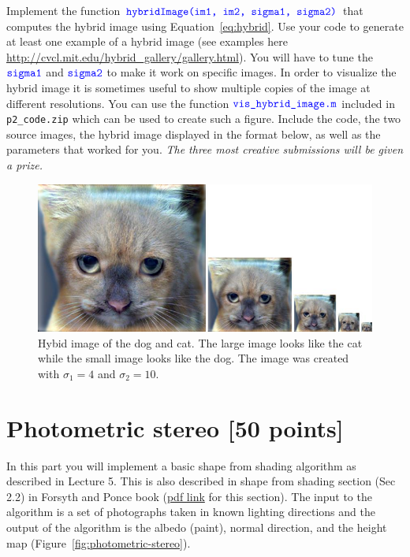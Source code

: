 \documentclass[10pt,letterpaper]{article}
\newcommand{\cmd}[1] {{\color{blue}\texttt{#1}}}
\begin{document}
Implement the function $\cmd{hybridImage(im1, im2, sigma1, sigma2)}$ that computes the hybrid image using Equation~\ref{eq:hybrid}. Use your code to generate at least one example of a hybrid image (see examples here \url{http://cvcl.mit.edu/hybrid_gallery/gallery.html}). You will have to tune the $\cmd{sigma1}$ and $\cmd{sigma2}$ to make it work on specific images. In order to visualize the hybrid image it is sometimes useful to show multiple copies of the image at different resolutions. You can use the function $\cmd{vis\_hybrid\_image.m}$ included in \cmd{p2\_code.zip} which can be used to create such a figure. Include the code, the two source images, the hybrid image displayed in the format below, as well as the parameters that worked for you. \emph{The three most creative submissions will be given a prize.}

\begin{figure}[h]
\centering
\includegraphics[width=0.85\linewidth]{./output/hybrid-4-10.jpg}
\caption{Hybid image of the dog and cat. The large image looks like the cat while the small image looks like the dog. The image was created with $\sigma_1 = 4$ and $\sigma_2 = 10$.}
\end{figure}


\newpage

\section{Photometric stereo [50 points]}


In this part you will implement a basic shape from shading algorithm as described in Lecture 5. This is also described in shape from shading section (Sec 2.2) in Forsyth and Ponce book (\href{http://www.sci.utah.edu/~gerig/CS6320-S2012/Materials/Forsyth-Ponce-SfS.pdf}{pdf link} for this section). The input to the algorithm is a set of photographs taken in known lighting directions and the output of the algorithm is the albedo (paint), normal direction, and the height map (Figure~\ref{fig:photometric-stereo}).
\end{document}
